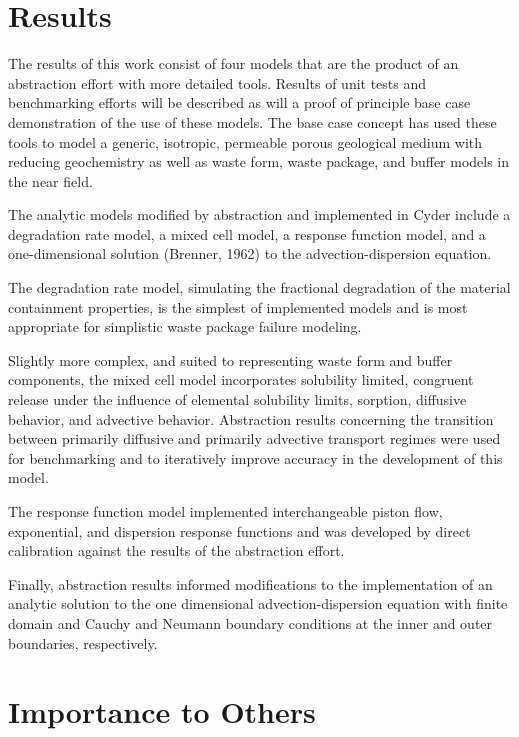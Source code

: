 \documentclass[letterpaper]{article}
\begin{document}
\section{Results}

The results of this work consist of four models that are the product of an 
abstraction effort with more detailed tools. Results of unit tests and 
benchmarking efforts will be described as will a proof of principle base case 
demonstration of the use of these models. The base case concept has used these 
tools to model a generic, isotropic, permeable porous geological medium with 
reducing geochemistry as well as waste form, waste package, and buffer models in 
the near field.

The analytic models modified by abstraction and implemented in Cyder include a 
degradation rate model, a mixed cell model, a response function model, and a 
one-dimensional solution (Brenner, 1962) to the advection-dispersion equation.

The degradation rate model, simulating the fractional degradation of the material 
containment properties, is the simplest of implemented models and is most 
appropriate for simplistic waste package failure modeling. 

Slightly more complex, and suited to representing waste form and buffer 
components, the mixed cell model incorporates solubility limited, congruent 
release under the influence of elemental solubility limits, sorption, diffusive 
behavior, and advective behavior. Abstraction results concerning the 
transition between primarily diffusive and primarily advective transport regimes 
were used for benchmarking and to iteratively improve accuracy in the development 
of this model.

The response function model implemented interchangeable piston flow, 
exponential, and dispersion response functions and was developed by direct 
calibration against the results of the abstraction effort.  

Finally, abstraction results informed modifications to the implementation of an 
analytic solution to the one dimensional advection-dispersion equation with 
finite domain and Cauchy and Neumann boundary conditions at the inner and outer 
boundaries, respectively. 

\section{Importance to Others}
\end{document}
